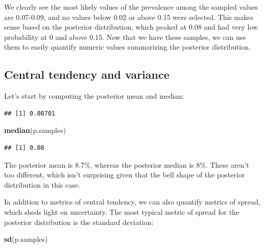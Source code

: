 \documentclass[
]{book}
\newenvironment{Shaded}{\begin{snugshade}}{\end{snugshade}}
\newcommand{\FunctionTok}[1]{\textcolor[rgb]{0.13,0.29,0.53}{\textbf{#1}}}
\newcommand{\NormalTok}[1]{#1}
\newcommand{\OtherTok}[1]{\textcolor[rgb]{0.56,0.35,0.01}{#1}}
\newcommand{\SpecialCharTok}[1]{\textcolor[rgb]{0.81,0.36,0.00}{\textbf{#1}}}
\begin{document}
We clearly see the most likely values of the prevalence among the sampled values are 0.07-0.09, and no values below 0.02 or above 0.15 were selected. This makes sense based on the posterior distribution, which peaked at 0.08 and had very low probability at 0 and above 0.15. Now that we have these samples, we can use them to easily quantify numeric values summarizing the posterior distribution.

\subsection{Central tendency and variance}\label{central-tendency-and-variance}

Let's start by computing the posterior mean and median:

\begin{Shaded}
\end{Shaded}

\begin{verbatim}
## [1] 0.08701
\end{verbatim}

\begin{Shaded}
\begin{Highlighting}[]
\FunctionTok{median}\NormalTok{(p.samples)}
\end{Highlighting}
\end{Shaded}

\begin{verbatim}
## [1] 0.08
\end{verbatim}

The posterior mean is 8.7\%, whereas the posterior median is 8\%. These aren't too different, which isn't surprising given that the bell shape of the posterior distribution in this case.

In addition to metrics of central tendency, we can also quantify metrics of spread, which sheds light on uncertainty. The most typical metric of spread for the posterior distribution is the standard deviation:

\begin{Shaded}
\begin{Highlighting}[]
\FunctionTok{sd}\NormalTok{(p.samples)}
\end{Highlighting}
\end{Shaded}
\end{document}
